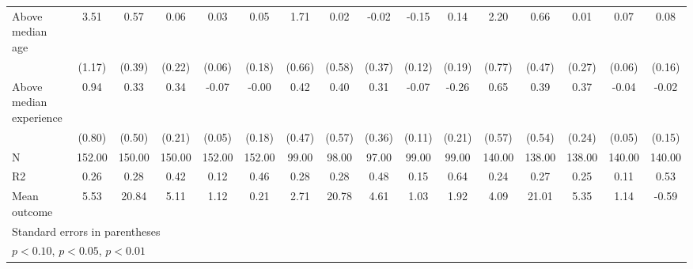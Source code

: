 {\begin{tabular}{l*{15}{c}}
\addlinespace
Above median age&        3.51\sym{***}&        0.57         &        0.06         &        0.03         &        0.05         &        1.71\sym{**} &        0.02         &       -0.02         &       -0.15         &        0.14         &        2.20\sym{***}&        0.66         &        0.01         &        0.07         &        0.08         \\
            &      (1.17)         &      (0.39)         &      (0.22)         &      (0.06)         &      (0.18)         &      (0.66)         &      (0.58)         &      (0.37)         &      (0.12)         &      (0.19)         &      (0.77)         &      (0.47)         &      (0.27)         &      (0.06)         &      (0.16)         \\
\addlinespace
Above median experience&        0.94         &        0.33         &        0.34         &       -0.07         &       -0.00         &        0.42         &        0.40         &        0.31         &       -0.07         &       -0.26         &        0.65         &        0.39         &        0.37         &       -0.04         &       -0.02         \\
            &      (0.80)         &      (0.50)         &      (0.21)         &      (0.05)         &      (0.18)         &      (0.47)         &      (0.57)         &      (0.36)         &      (0.11)         &      (0.21)         &      (0.57)         &      (0.54)         &      (0.24)         &      (0.05)         &      (0.15)         \\
\midrule
N           &      152.00         &      150.00         &      150.00         &      152.00         &      152.00         &       99.00         &       98.00         &       97.00         &       99.00         &       99.00         &      140.00         &      138.00         &      138.00         &      140.00         &      140.00         \\
R2          &        0.26         &        0.28         &        0.42         &        0.12         &        0.46         &        0.28         &        0.28         &        0.48         &        0.15         &        0.64         &        0.24         &        0.27         &        0.25         &        0.11         &        0.53         \\
Mean outcome&        5.53         &       20.84         &        5.11         &        1.12         &        0.21         &        2.71         &       20.78         &        4.61         &        1.03         &        1.92         &        4.09         &       21.01         &        5.35         &        1.14         &       -0.59         \\
\bottomrule
\multicolumn{16}{l}{\footnotesize Standard errors in parentheses}\\
\multicolumn{16}{l}{\footnotesize \sym{*} \(p<0.10\), \sym{**} \(p<0.05\), \sym{***} \(p<0.01\)}\\
\end{tabular}
}
